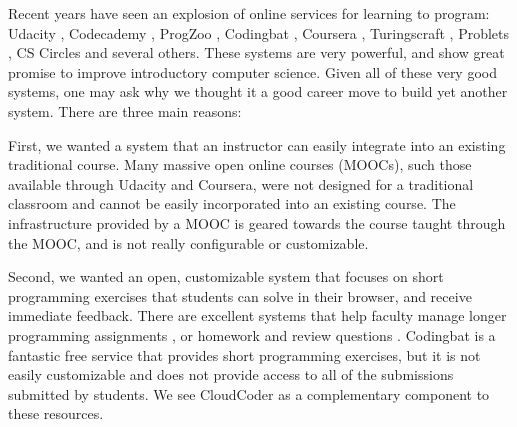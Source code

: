 \documentclass{sig-alternate}
\begin{document}
Recent years have seen an explosion of online services for learning
to program:  Udacity \cite{udacity}, Codecademy \cite{codeacademy},
ProgZoo \cite{progzoo}, 
Codingbat \cite{codingbat}, Coursera \cite{coursera}, Turingscraft
\cite{turingscraft}, Problets \cite{Kumar:2005:GPA:1163405.1163408}, CS Circles \cite{Pritchard:2013:CCI:2445196.2445370} and
several others.  These systems are very powerful, and show great promise to
improve introductory computer science.  Given all of these
very good systems, one may ask why we thought it a good career move
to build yet another system.  There are three main reasons:


First, we wanted a system that an instructor can easily integrate into an existing traditional course.
  Many massive open online courses (MOOCs), such those available through Udacity and
  Coursera, were not designed for a traditional classroom and cannot be easily incorporated into an existing course.  
  The infrastructure provided by a MOOC is geared towards the course
  taught through the MOOC, and is not really configurable or customizable.


Second, we wanted an open, customizable system that focuses on short programming exercises that students
  can solve in their browser, and receive immediate feedback.  There are excellent systems that help
  faculty manage longer programming assignments
  \cite{Edwards:2008:WAG:1384271.1384371}, or homework and review questions
  \cite{turingscraft, Kumar:2005:GPA:1163405.1163408}.  Codingbat
  \cite{codingbat} is a fantastic free service that provides short
  programming exercises, but it is not easily customizable and does not provide
  access to all of the submissions submitted by students.
  We see CloudCoder as a complementary component to these resources.

\end{document}
